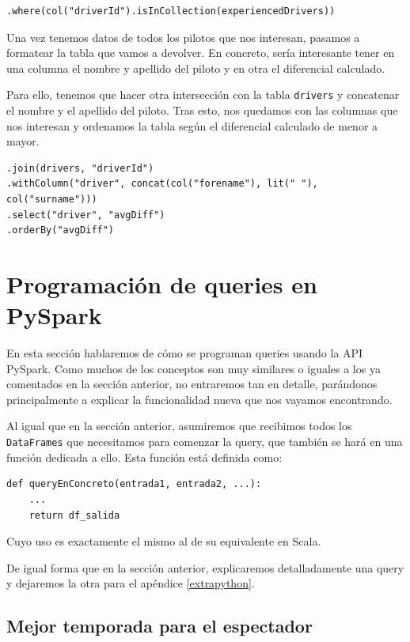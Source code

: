 \documentclass[12pt,twoside,titlepage]{report}
\begin{document}
\begin{lstlisting}
.where(col("driverId").isInCollection(experiencedDrivers))
\end{lstlisting}

Una vez tenemos datos de todos los pilotos que nos interesan, pasamos a formatear la tabla que vamos a devolver. En concreto, sería interesante tener en una columna el nombre y apellido del piloto y en otra el diferencial calculado.

Para ello, tenemos que hacer otra intersección con la tabla \texttt{drivers} y concatenar el nombre y el apellido del piloto. Tras esto, nos quedamos con las columnas que nos interesan y ordenamos la tabla según el diferencial calculado de menor a mayor.

\begin{lstlisting}
.join(drivers, "driverId")
.withColumn("driver", concat(col("forename"), lit(" "), col("surname")))
.select("driver", "avgDiff")
.orderBy("avgDiff")
\end{lstlisting}

\newpage




\section{Programación de queries en PySpark}

En esta sección hablaremos de cómo se programan queries usando la API PySpark. Como muchos de los conceptos son muy similares o iguales a los ya comentados en la sección anterior, no entraremos tan en detalle, parándonos principalmente a explicar la funcionalidad nueva que nos vayamos encontrando.

Al igual que en la sección anterior, asumiremos que recibimos todos los \texttt{DataFrames} que necesitamos para comenzar la query, que también se hará en una función dedicada a ello. Esta función está definida como:

\begin{lstlisting}
def queryEnConcreto(entrada1, entrada2, ...):
	...
	return df_salida
\end{lstlisting}

Cuyo uso es exactamente el mismo al de su equivalente en Scala.

De igual forma que en la sección anterior, explicaremos detalladamente una query y dejaremos la otra para el apéndice \ref{extrapython}.

\subsection{Mejor temporada para el espectador}
\end{document}
